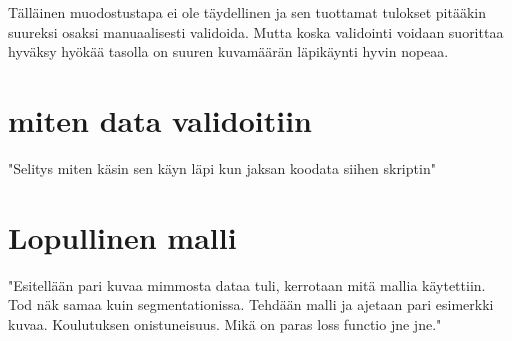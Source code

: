 Tälläinen muodostustapa ei ole täydellinen ja sen tuottamat tulokset pitääkin suureksi osaksi manuaalisesti validoida. Mutta koska validointi voidaan suorittaa hyväksy hyökää tasolla on suuren kuvamäärän läpikäynti hyvin nopeaa.

\section{miten data validoitiin}

"Selitys miten käsin sen käyn läpi kun jaksan koodata siihen skriptin"

\section{Lopullinen malli}

"Esitellään pari kuvaa mimmosta dataa tuli, kerrotaan mitä mallia käytettiin. Tod näk samaa kuin segmentationissa. Tehdään malli ja ajetaan pari esimerkki kuvaa. Koulutuksen onistuneisuus. Mikä on paras loss functio jne jne."


